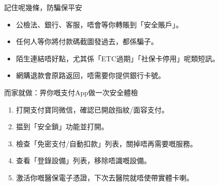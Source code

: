 \begin{tcbwarn}{記住呢幾條，防騙保平安}
\begin{itemize}
  \item 公檢法、銀行、客服，唔會等你轉賬到「安全賬戶」。
  \item 任何人等你將付款碼截圖發過去，都係騙子。
  \item 陌生連結唔好點，尤其係「ETC過期」「社保卡停用」呢類短訊。
  \item 網購退款會原路返回，唔需要你提供銀行卡號。
\end{itemize}

\end{tcbwarn}

\begin{tcbpractice}{而家就做：畀你嘅支付App做一次安全體檢}
\begin{enumerate}
  \item 打開支付寶同微信，確認已開啟指紋/面容支付。
  \item 揾到「安全鎖」功能並打開。
  \item 檢查「免密支付/自動扣款」列表，關掉唔再需要嘅服務。
  \item 查看「登錄設備」列表，移除唔識嘅設備。
  \item 激活你嘅醫保電子憑證，下次去醫院就唔使帶實體卡喇。
\end{enumerate}

\end{tcbpractice}
